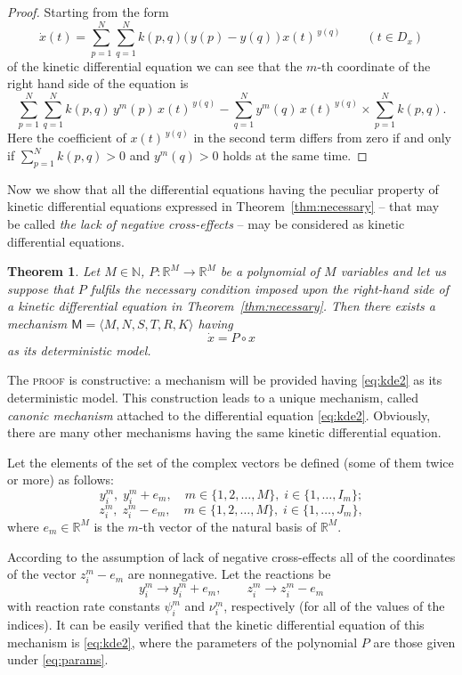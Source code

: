 \documentclass[12pt,a4paper]{article}
\newtheorem{theorem}{Theorem}[section]
\newcommand{\N}{\mathbb{N}}
\newcommand{\R}{\mathbb{R}}
\begin{document}
\begin{proof}
Starting from the form
\[
  \dot{x}(t) = \sum_{p=1}^{N} \sum_{q=1}^{N}
  k(p,q)\bigl(\,y(p) - y(q)\,\bigr)\, x(t)^{\,y(q)}
  \qquad (t \in D_x)
\]
of the kinetic differential equation we can see that the $m$-th coordinate of the right hand side of the equation is
\[
  \sum_{p=1}^{N} \sum_{q=1}^{N} k(p,q)\, y^m(p)\, x(t)^{\,y(q)}
  - \sum_{q=1}^{N} y^m(q)\, x(t)^{\,y(q)} \times \sum_{p=1}^{N} k(p,q).
\]
Here the coefficient of $x(t)^{\,y(q)}$ in the second term differs from zero if and only if $\sum_{p=1}^{N} k(p,q) > 0$ and $y^m(q) > 0$ holds at the same time.
\end{proof}

Now we show that all the differential equations having the peculiar property of kinetic differential equations expressed in Theorem~\ref{thm:necessary} -- that may be called \emph{the lack of negative cross-effects} -- may be considered as kinetic differential equations.

\begin{theorem}\label{thm:sufficient}
Let $M \in \N$, $P \colon \R^M \to \R^M$ be a polynomial of $M$ variables and let us suppose that $P$ fulfils the necessary condition imposed upon the right-hand side of a kinetic differential equation in Theorem~\ref{thm:necessary}.  Then there exists a mechanism $\mathsf{M} = \langle M, N, S, T, R, K \rangle$ having
\begin{equation}\label{eq:kde2}
  \dot{x} = P \circ x
\end{equation}
as its deterministic model.
\end{theorem}

The \textsc{proof} is constructive: a mechanism will be provided having \eqref{eq:kde2} as its deterministic model.  This construction leads to a unique mechanism, called \emph{canonic mechanism} attached to the differential equation \eqref{eq:kde2}.  Obviously, there are many other mechanisms having the same kinetic differential equation.

Let the elements of the set of the complex vectors be defined (some of them twice or more) as follows:
\[
  y_i^m,\; y_i^m + e_m, \quad m \in \{1,2,\ldots,M\},\;
  i \in \{1,\ldots,I_m\};
\]
\[
  z_i^m,\; z_i^m - e_m, \quad m \in \{1,2,\ldots,M\},\;
  i \in \{1,\ldots,J_m\},
\]
where $e_m \in \R^M$ is the $m$-th vector of the natural basis of $\R^M$.

According to the assumption of lack of negative cross-effects all of the coordinates of the vector $z_i^m - e_m$ are nonnegative.  Let the reactions be
\begin{equation}\label{eq:canonic_reactions}
  y_i^m \to y_i^m + e_m, \qquad z_i^m \to z_i^m - e_m
\end{equation}
with reaction rate constants $\psi_i^m$ and $\nu_i^m$, respectively (for all of the values of the indices).  It can be easily verified that the kinetic differential equation of this mechanism is \eqref{eq:kde2}, where the parameters of the polynomial $P$ are those given under \eqref{eq:params}.
\end{document}
